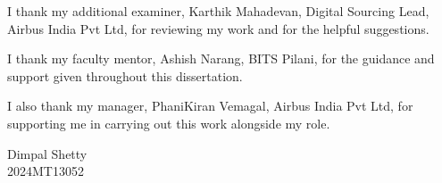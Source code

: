 \documentclass[12pt,oneside]{report}
\newcommand{\StudentName}{Dimpal Shetty}
\newcommand{\StudentID}{2024MT13052}
\newcommand{\OrgName}{Airbus India Pvt Ltd}
\begin{document}
I thank my additional examiner, Karthik Mahadevan, Digital Sourcing Lead, \OrgName, for reviewing my work and for the helpful suggestions.

I thank my faculty mentor, Ashish Narang, BITS Pilani, for the guidance and support given throughout this dissertation.

I also thank my manager, PhaniKiran Vemagal, \OrgName, for supporting me in carrying out this work alongside my role.

\vspace{2em}
\noindent\StudentName\\
\StudentID

\clearpage
{}
{}
\end{document}
